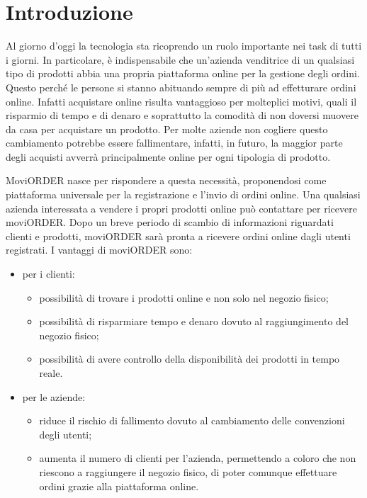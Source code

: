 
\chapter{Introduzione}
\label{cap:introduzione}

Al giorno d'oggi la tecnologia sta ricoprendo un ruolo importante nei task di tutti i giorni. In particolare, è indispensabile che un'azienda venditrice di un qualsiasi tipo di prodotti abbia una propria piattaforma online per la gestione degli ordini. Questo perché le persone si stanno abituando sempre di più ad effetturare ordini online. Infatti acquistare online risulta vantaggioso per molteplici motivi, quali il risparmio di tempo e di denaro e soprattutto la comodità di non doversi muovere da casa per acquistare un prodotto. Per molte aziende non cogliere questo cambiamento potrebbe essere fallimentare, infatti, in futuro, la maggior parte degli acquisti avverrà principalmente online per ogni tipologia di prodotto.

MoviORDER nasce per rispondere a questa necessità, proponendosi come piattaforma universale per la registrazione e l'invio di ordini online. Una qualsiasi azienda interessata a vendere i propri prodotti online può contattare \visione{} per ricevere moviORDER. Dopo un breve periodo di scambio di informazioni riguardati clienti e prodotti, moviORDER sarà pronta a ricevere ordini online dagli utenti registrati. 
I vantaggi di moviORDER sono:
\begin{itemize}
	\item per i clienti:
	\begin{itemize}
		\item possibilità di trovare i prodotti online e non solo nel negozio fisico;
		\item possibilità di risparmiare tempo e denaro dovuto al raggiungimento del negozio fisico;
		\item possibilità di avere controllo della disponibilità dei prodotti in tempo reale.
	\end{itemize}
	\item per le aziende:
	\begin{itemize}
		\item riduce il rischio di fallimento dovuto al cambiamento delle convenzioni degli utenti;
		\item aumenta il numero di clienti per l'azienda, permettendo a coloro che non riescono a raggiungere il negozio fisico, di poter comunque effettuare ordini grazie alla piattaforma online.
	\end{itemize}
\end{itemize}

